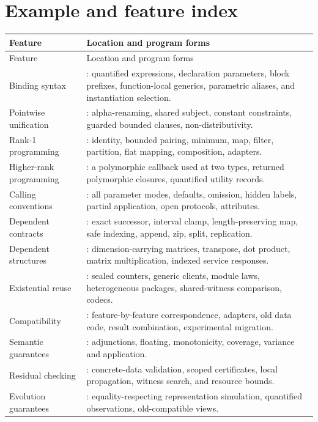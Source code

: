 \documentclass[11pt,a4paper,oneside]{report}
\theoremstyle{remark}
\begin{document}
\chapter{Example and feature index}
\label{app:index}
\begin{longtable}{@{}P{0.35\textwidth}P{0.59\textwidth}@{}}
\toprule
Feature & Location and program forms\\\midrule
\endfirsthead
\toprule Feature & Location and program forms\\\midrule
\endhead
Binding syntax & : quantified expressions, declaration
parameters, block prefixes, function-local generics, parametric aliases, and
instantiation selection.\\
Pointwise unification & : alpha-renaming, shared subject,
constant constraints, guarded bounded clauses, non-distributivity.\\
Rank-1 programming & : identity, bounded pairing, minimum,
map, filter, partition, flat mapping, composition, adapters.\\
Higher-rank programming & : a polymorphic callback used at two
types, returned polymorphic closures, quantified utility records.\\
Calling conventions & : all parameter modes, defaults,
omission, hidden labels, partial application, open protocols, attributes.\\
Dependent contracts & : exact successor, interval clamp,
length-preserving map, safe indexing, append, zip, split, replication.\\
Dependent structures & : dimension-carrying matrices,
transpose, dot product, matrix multiplication, indexed service responses.\\
Existential reuse & : sealed counters, generic clients, module
laws, heterogeneous packages, shared-witness comparison, codecs.\\
Compatibility & : feature-by-feature correspondence,
adapters, old data code, result combination, experimental migration.\\
Semantic guarantees & :
adjunctions, floating, monotonicity, coverage, variance and application.\\
Residual checking & : concrete-data validation, scoped
certificates, local propagation, witness search, and resource bounds.\\
Evolution guarantees & : equality-respecting representation
simulation, quantified observations, old-compatible views.\\\bottomrule
\end{longtable}
\end{document}
